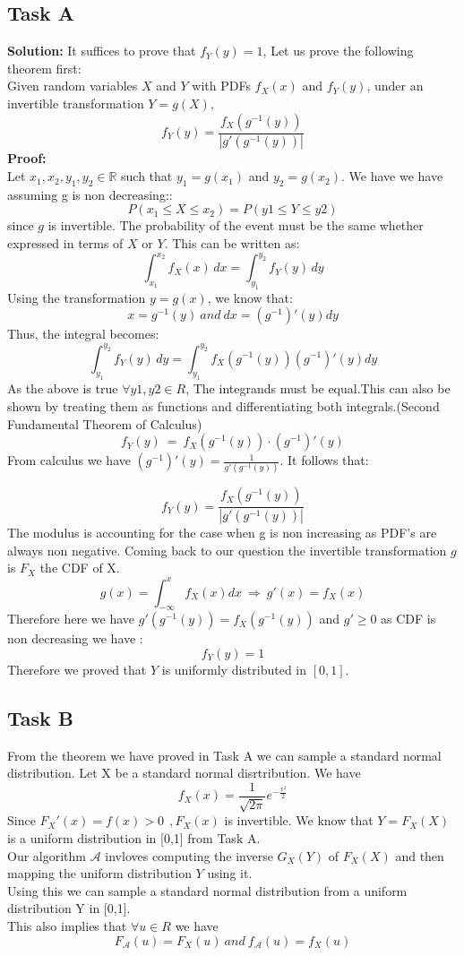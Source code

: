 \documentclass[12pt]{article}
\begin{document}
\subsection{Task A}
\textbf{Solution: } \newline
It suffices to prove that $f_{Y}(y)=1$,
Let us prove the following theorem first: \\
Given random variables $X$ and $Y$ with PDFs $f_X(x)$ and $f_Y(y)$, under an invertible transformation $Y = g(X)$, 
\[
f_Y(y) = \frac{f_X(g^{-1}(y))}{\left| g'(g^{-1}(y)) \right|}
\]
\textbf{Proof:} \\
Let $x_1, x_2, y_1, y_2 \in \mathbb{R}$ such that $y_1 = g(x_1)$ and $y_2 = g(x_2)$.
We have we have assuming g is non decreasing::
\[
P(x_1 \leq X \leq x_2) = P(y1 \leq Y \leq y2)
\]
since $g$ is invertible.
The probability of the event must be the same whether expressed in terms of $X$ or $Y$. This can be written as:
\[
\int_{x_1}^{x_2} f_X(x) \, dx = \int_{y_1}^{y_2} f_Y(y) \, dy
\]
Using the transformation $y = g(x)$, we know that:
\[
x=g^{-1}(y)\ and\ dx=(g^{-1})'(y)dy
\]
Thus, the integral becomes:
\[
\int_{y_1}^{y_2} f_Y(y) \, dy = \int_{y_1}^{y_2} f_X(g^{-1}(y))(g^{-1})'(y)dy
\]
As the above is true $\forall y1,y2 \in R$, The integrands must be equal.This can also be shown by treating them as functions and differentiating both integrals.(Second Fundamental Theorem of Calculus)
\[
f_Y(y) \ =\ f_X(g^{-1}(y)) \cdot (g^{-1})'(y)
\]
From calculus we have $(g^{-1})'(y)=\frac{1}{g'(g^{-1}(y))}$. It follows that:

\[
\boxed{f_Y(y) = \frac{f_X(g^{-1}(y))}{\left| g'(g^{-1}(y)) \right|}}
\]
The modulus is accounting for the case when g is non increasing as PDF's are always non negative.
Coming back to our question the invertible transformation $g$ is $F_{X}$ the CDF of X.
\[g(x)=\int_{-\infty}^{x}f_{X}(x)dx\  \Rightarrow\ g'(x)=f_{X}(x) \] 
Therefore here we have $g'(g^{-1}(y))=f_{X}(g^{-1}(y))$ and $g'\ge 0$ as CDF is non decreasing we have :
\[f_{Y}(y)=1\]
Therefore we proved that $Y$ is uniformly distributed in $[0,1]$.

\subsection{Task B}
From the theorem we have proved in Task A we can sample a standard normal distribution.
Let X be a standard normal disrtribution. We have
\[f_X(x) = \frac{1}{\sqrt{2\pi}} e^{-\frac{x^2}{2}}\]
Since $F_{X}'(x)=f(x) > 0\ \ ,F_{X}(x)$ is invertible.
We know that $Y=F_{X}(X)$ is a uniform distribution in [0,1] from Task A.\\
Our algorithm $\mathcal{A}$ invloves computing the inverse $G_{X}(Y)$ of $F_{X}(X)$ and then mapping the uniform distribution $Y$ using it.\\
Using this we can sample a standard normal distribution from a uniform distribution Y in [0,1].\\
This also implies that $\forall u \in R$ we have 
\[F_{\mathcal{A}}(u)=F_{X}(u)\ and\ f_{\mathcal{A}}(u)=f_{X}(u)\]
\end{document}
